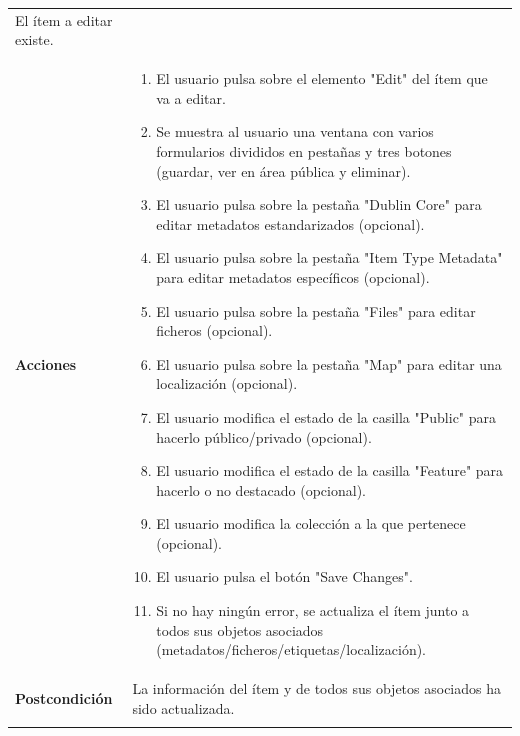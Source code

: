 \documentclass[
]{article}
\providecommand{\tightlist}{%
  \setlength{\itemsep}{0pt}\setlength{\parskip}{0pt}}
\begin{document}
\begin{longtable}[]{@{}ll@{}}
\begin{minipage}[t]{0.79\columnwidth}
El ítem a editar existe.\strut
\end{minipage}\tabularnewline
\begin{minipage}[t]{0.15\columnwidth}\raggedright
\textbf{Acciones}\strut
\end{minipage} & \begin{minipage}[t]{0.79\columnwidth}\raggedright
\begin{enumerate}
\def\labelenumi{\arabic{enumi}.}
\tightlist
\item
  El usuario pulsa sobre el elemento "Edit" del ítem que va a editar.
\item
  Se muestra al usuario una ventana con varios formularios divididos en
  pestañas y tres botones (guardar, ver en área pública y eliminar).
\item
  El usuario pulsa sobre la pestaña "Dublin Core" para editar metadatos
  estandarizados (opcional).
\item
  El usuario pulsa sobre la pestaña "Item Type Metadata" para editar
  metadatos específicos (opcional).
\item
  El usuario pulsa sobre la pestaña "Files" para editar ficheros
  (opcional).
\item
  El usuario pulsa sobre la pestaña "Map" para editar una localización
  (opcional).
\item
  El usuario modifica el estado de la casilla "Public" para hacerlo
  público/privado (opcional).
\item
  El usuario modifica el estado de la casilla "Feature" para hacerlo o
  no destacado (opcional).
\item
  El usuario modifica la colección a la que pertenece (opcional).
\item
  El usuario pulsa el botón "Save Changes".
\item
  Si no hay ningún error, se actualiza el ítem junto a todos sus objetos
  asociados (metadatos/ficheros/etiquetas/localización).
\end{enumerate}\strut
\end{minipage}\tabularnewline
\begin{minipage}[t]{0.15\columnwidth}\raggedright
\textbf{Postcondición}\strut
\end{minipage} & \begin{minipage}[t]{0.79\columnwidth}\raggedright
La información del ítem y de todos sus objetos asociados ha sido
actualizada.\strut
\end{minipage}\tabularnewline
\begin{minipage}[t]{0.15\columnwidth}\raggedright

\end{minipage}
\end{longtable}
\end{document}
